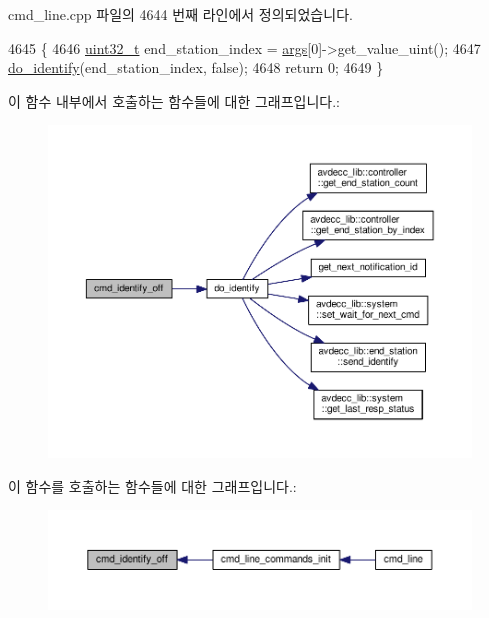 cmd\+\_\+line.\+cpp 파일의 4644 번째 라인에서 정의되었습니다.


\begin{DoxyCode}
4645 \{
4646     \hyperlink{parse_8c_a6eb1e68cc391dd753bc8ce896dbb8315}{uint32\_t} end\_station\_index = \hyperlink{namespaceastime__fitline_a8187411843a6284ffb964ef3fb9fcab3}{args}[0]->get\_value\_uint();
4647     \hyperlink{classcmd__line_a8a57d2f44b2bcd1061685b1d5fb5b271}{do\_identify}(end\_station\_index, \textcolor{keyword}{false});
4648     \textcolor{keywordflow}{return} 0;
4649 \}
\end{DoxyCode}


이 함수 내부에서 호출하는 함수들에 대한 그래프입니다.\+:
\nopagebreak
\begin{figure}[H]
\begin{center}
\leavevmode
\includegraphics[width=350pt]{classcmd__line_af43957351c668064746ad16774446b33_cgraph}
\end{center}
\end{figure}




이 함수를 호출하는 함수들에 대한 그래프입니다.\+:
\nopagebreak
\begin{figure}[H]
\begin{center}
\leavevmode
\includegraphics[width=350pt]{classcmd__line_af43957351c668064746ad16774446b33_icgraph}
\end{center}
\end{figure}


